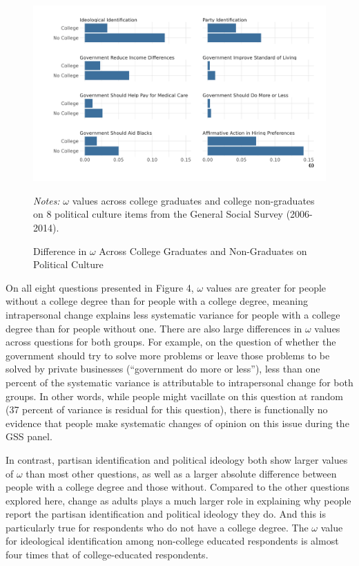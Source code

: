 \documentclass[
  12pt,
]{article}
\begin{document}
\begin{figure}[hbt]
\begin{center}
\caption{Difference in $\omega$ Across College Graduates and Non-Graduates on Political Culture}

\includegraphics[width=450px]{../figures/figure_4}

\end{center}
\footnotesize{\textit{Notes:} $\omega$ values across college graduates and college non-graduates on 8 political culture items from the General Social Survey (2006-2014).}
\end{figure}

On all eight questions presented in Figure 4, \(\omega\) values are
greater for people without a college degree than for people with a
college degree, meaning intrapersonal change explains less systematic
variance for people with a college degree than for people without one.
There are also large differences in \(\omega\) values across questions
for both groups. For example, on the question of whether the government
should try to solve more problems or leave those problems to be solved
by private businesses (``government do more or less''), less than one
percent of the systematic variance is attributable to intrapersonal
change for both groups. In other words, while people might vacillate on
this question at random (37 percent of variance is residual for this
question), there is functionally no evidence that people make systematic
changes of opinion on this issue during the GSS panel.

In contrast, partisan identification and political ideology both show
larger values of \(\omega\) than most other questions, as well as a
larger absolute difference between people with a college degree and
those without. Compared to the other questions explored here, change as
adults plays a much larger role in explaining why people report the
partisan identification and political ideology they do. And this is
particularly true for respondents who do not have a college degree. The
\(\omega\) value for ideological identification among non-college
educated respondents is almost four times that of college-educated
respondents.
\end{document}
